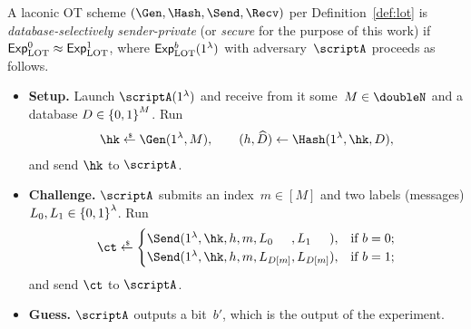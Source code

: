 \begin{definition}\label{def:lot-security}
A laconic OT scheme $(\Gen,\allowbreak\Hash,\allowbreak\Send,\allowbreak\Recv)$ per Definition~\ref{def:lot} is \emph{database-selectively sender-private} (or \emph{secure} for the purpose of this work) if ${\ExpLOT{0}\approx\ExpLOT{1}}$, where $\ExpLOT{b}(1^\lambda)$ with adversary~$\scriptA$ proceeds as follows.
\begin{itemize}\upshape
\item\textbf{Setup.}
Launch $\scriptA(1^\lambda)$ and
receive from it some~${M\in\doubleN}$ and a database ${D\in{\{0,1\}}^M}$.
Run
\begin{align*}
\hk\draws\Gen(1^\lambda,M),\qquad
(h,\widehat{D})\gets\Hash(1^\lambda,\hk,D),
\end{align*}
and send $\hk$ to $\scriptA$.
\item\textbf{Challenge.}
$\scriptA$ submits an index~${m\in[M]}$ and
two labels (messages) ${L_0,L_1\in{\{0,1\}}^\lambda}$.
Run
\begin{align*}
\ct\draws\begin{cases}
\Send(1^\lambda,\hk,h,m,
L_{\mathrlap{0}\phantom{D[m]}},L_{\mathrlap{1}\phantom{D[m]}}),&
\textup{if }b=0;\\
\Send(1^\lambda,\hk,h,m,L_{D[m]},L_{D[m]}),&\textup{if }b=1;
\end{cases}
\end{align*}
and send $\ct$ to $\scriptA$.
\item\textbf{Guess.}
$\scriptA$ outputs a bit~$b'$, which is the output of the experiment.
\end{itemize}
\end{definition}
